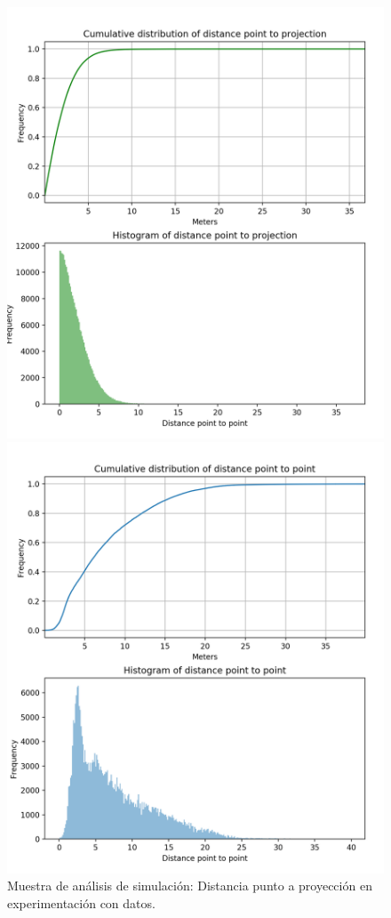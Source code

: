 \begin{figure}[!htb]
\begin{minipage}{0.48\textwidth}
\centering
\includegraphics[width=1.2\textwidth]{./Imagenes/SimulateCumulativePointProjection.png}
\caption{Muestra de análisis de simulación: Distancia punto a proyección en 
experimentación con datos.}
\label{figure:SimulatedPointToProjection}
\end{minipage}\hfill
\begin{minipage}{0.48\textwidth}
\centering
\includegraphics[width=1.2\textwidth]{./Imagenes/SimulateCumulativePointPoint.png}

\end{minipage}
\end{figure}
